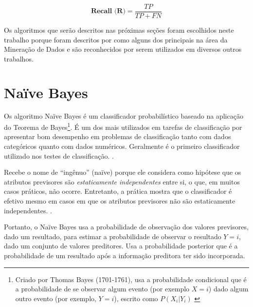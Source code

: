 \begin{equation}\label{eq:recall}
\textbf{Recall (R)} = \frac{TP}{TP + FN}
\end{equation}

Os algoritmos que serão descritos nas próximas seções foram escolhidos neste trabalho porque foram descritos por  como alguns dos principais na área da Mineração de Dados e são reconhecidos por serem utilizados em diversos outros trabalhos.

\section{Naïve Bayes}\label{sec:naive-bayes}
Os algoritmo Naïve Bayes é um classificador probabilístico baseado na aplicação do Teorema de Bayes\footnote{Criado por Thomas Bayes (1701-1761), usa a probabilidade condicional que é a probabilidade de se observar algum evento (por exemplo $X = i$) dado algum outro evento (por exemplo, $Y=i$), escrito como $P(X_i|Y_i)$ \cite{bruce_estatistica_2019}}. É um dos mais utilizados em tarefas de classificação por apresentar bom desempenho em problemas de classificação tanto com dados categóricos quanto com dados numéricos. Geralmente é o primeiro classificador utilizado nos testes de classificação. \cite{Boscarioli2017} \cite{amaral_introducao_2018} \cite{goldschmidt2005} \cite{bruce_estatistica_2019}.

Recebe o nome de ``ingênuo'' (naïve) porque ele considera como hipótese que os atributos previsores são \textit{estaticamente independentes} entre si, o que, em muitos casos práticos, não ocorre. Entretanto, a prática mostra que o classificador é efetivo mesmo em casos em que os atributos previsores não são estaticamente independentes. \cite{Boscarioli2017} \cite{goldschmidt2005} \cite{bruce_estatistica_2019}.

Portanto, o Naïve Bayes usa a probabilidade de observação dos valores previsores, dado um resultado, para estimar a probabilidade de observar o resultado $Y = i $, dado um conjunto de valores preditores. Usa a probabilidade posterior que é a probabilidade de um resultado após a informação preditora ter sido incorporada.

